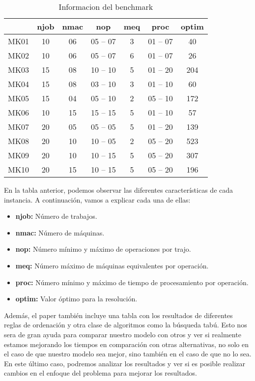 \begin{table}[ht]
    \centering
    \begin{tabular}[ht]{c|ccccc|c} 
                  & njob & nmac & nop & meq & proc & optim \\
        \hline 
        MK01      & 10  & 06    & 05 -- 07  & 3  & 01 -- 07  & 40\\
        MK02      & 10  & 06    & 05 -- 07  & 6  & 01 -- 07  & 26\\
        MK03      & 15  & 08    & 10 -- 10  & 5  & 01 -- 20  & 204\\
        MK04      & 15  & 08    & 03 -- 10  & 3  & 01 -- 10  & 60\\
        MK05      & 15  & 04    & 05 -- 10  & 2  & 05 -- 10  & 172\\
        MK06      & 10  & 15    & 15 -- 15  & 5  & 01 -- 10  & 57\\
        MK07      & 20  & 05    & 05 -- 05  & 5  & 01 -- 20  & 139\\
        MK08      & 20  & 10    & 10 -- 05  & 2  & 05 -- 20  & 523\\
        MK09      & 20  & 10    & 10 -- 15  & 5  & 05 -- 20  & 307\\
        MK10      & 20  & 15    & 10 -- 15  & 5  & 05 -- 20  & 196\\
    \end{tabular}
    \caption{Informacion del benchmark}
\end{table}

En la tabla anterior, podemos observar las diferentes características de cada instancia. A continuación,
vamos a explicar cada una de ellas:
\begin{itemize}
    \item \textbf{njob:} Número de trabajos.
    \item \textbf{nmac:} Número de máquinas.
    \item \textbf{nop:} Número mínimo y máximo de operaciones por trajo.
    \item \textbf{meq:} Número máximo de máquinas equivalentes por operación.
    \item \textbf{proc:} Número mínimo y máximo de tiempo de procesamiento por operación.
    \item \textbf{optim:} Valor óptimo para la resolución.
\end{itemize} 

Además, el paper \cite{pbrandimarte} también incluye una tabla con los resultados de diferentes
reglas de ordenación y otra clase de algoritmos como la búsqueda tabú. Esto nos sera de gran ayuda
para comparar nuestro modelo con otros y ver si realmente estamos mejorando los tiempos en
comparación con otras alternativas, no solo en el caso de que nuestro modelo sea mejor, sino también
en el caso de que no lo sea. En este último caso, podremos analizar los resultados y ver si es posible
realizar cambios en el enfoque del problema para mejorar los resultados.